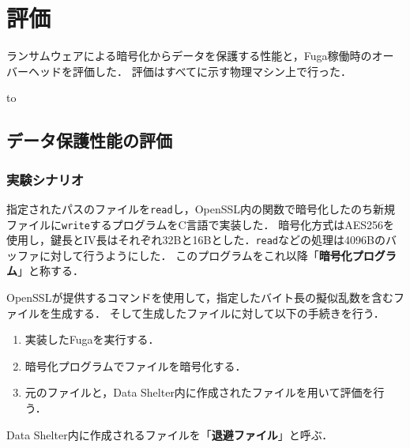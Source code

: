 \chapter{評価}
\label{chap:eval}
ランサムウェアによる暗号化からデータを保護する性能と，Fuga稼働時のオーバーヘッドを評価した．
評価はすべてに示す物理マシン上で行った．
\begin{table}[t]
  \caption{Environment of the physical machine used for the evaluation.}
  \label{tab:experiment-machine-kashiwa}
  \hbox to
\end{table}

\section{データ保護性能の評価}
\subsection{実験シナリオ}
指定されたパスのファイルを\texttt{read}し，OpenSSL内の関数で暗号化したのち新規ファイルに\texttt{write}するプログラムをC言語で実装した．
暗号化方式はAES256を使用し，鍵長とIV長はそれぞれ32Bと16Bとした．\texttt{read}などの処理は4096Bのバッファに対して行うようにした．
このプログラムをこれ以降「\textbf{暗号化プログラム}」と称する．

OpenSSLが提供するコマンドを使用して，指定したバイト長の擬似乱数を含むファイルを生成する．
そして生成したファイルに対して以下の手続きを行う．
\begin{enumerate}
  \item 実装したFugaを実行する．
  \item 暗号化プログラムでファイルを暗号化する．
  \item 元のファイルと，Data Shelter内に作成されたファイルを用いて評価を行う．
\end{enumerate}
Data Shelter内に作成されるファイルを「\textbf{退避ファイル}」と呼ぶ．

